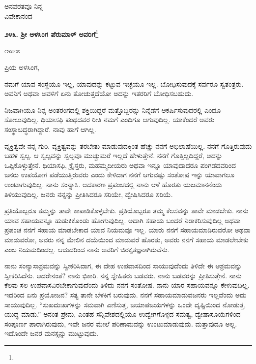 {\flushright
ಅನವರತವೂ ನಿನ್ನ\\ವಿವೇಕಾನಂದ\par}

\begin{center}
\textbf{೨೪೩. ಶ‍್ರೀ ಅಳಸಿಂಗ ಪೆರುಮಾಳ್ ಅವರಿಗೆ}\footnote{}
\end{center}

\begin{flushright}
೧೮೯೫
\end{flushright}

\noindent
ಪ್ರಿಯ ಅಳಸಿಂಗ,

ನಮಗೆ ಯಾವ ಸಂಸ್ಥೆಯೂ ಇಲ್ಲ, ಯಾವುದನ್ನು ಕಟ್ಟುವ ಇಚ್ಛೆಯೂ ಇಲ್ಲ. ಬೋಧಿಸುವುದಕ್ಕೆ ಸರ್ವರೂ ಸ್ವತಂತ್ರರು. ಅವನಿಗೆ ಅಥವಾ ಅವಳಿಗೆ ಏನು ತೋಚುತ್ತದೆಯೋ ಅದನ್ನು ಇತರರಿಗೆ ಬೋಧಿಸಬಹುದು.

ನಿಜವಾಗಿಯೂ ನಿನ್ನ ಅಂತರಂಗದಲ್ಲಿ ಶಕ್ತಿಯಿದ್ದರೆ ಮತ್ತೊಬ್ಬರನ್ನು ನಿನ್ನೆಡೆಗೆ ಆಕರ್ಷಿಸುವುದರಲ್ಲಿ ಎಂದೂ ಸೋಲುವುದಿಲ್ಲ. ಥಿಯಾಸಫಿ ಪಂಥದವರ ರೀತಿ ನಮಗೆ ಎಂದಿಗೂ ಆಗುವುದಿಲ್ಲ. ಯಾಕೆಂದರೆ ಅವರು ಸಂಸ್ಥಾಬದ್ಧರಾಗಿದ್ದಾರೆ. ನಾವು ಹಾಗೆ ಆಗಿಲ್ಲ.

ವ್ಯಕ್ತಿತ್ವವೇ ನನ್ನ ಗುರಿ. ವ್ಯಕ್ತಿತ್ವವನ್ನು ತರಬೇತು ಮಾಡುವುದಕ್ಕಿಂತ ಹೆಚ್ಚು ನನಗೆ ಅಭಿಲಾಷೆಯಿಲ್ಲ. ನನಗೆ ಗೊತ್ತಿರುವುದು ಬಹಳ ಸ್ವಲ್ಪ. ಆ ಸ್ವಲ್ಪವನ್ನು ಸ್ವಲ್ಪವೂ ಮುಚ್ಚುಮರೆ ಇಲ್ಲದೆ ಹೇಳುತ್ತೇನೆ. ನನಗೆ ಗೊತ್ತಿಲ್ಲದಿದ್ದರೆ, ಅದನ್ನು ಒಪ್ಪಿಕೊಳ್ಳುತ್ತೇನೆ. ಥಿಯಾಸಫಿ, ಕ್ರೈಸ್ತರು, ಮಹಮ್ಮದೀಯರು ಅಥವಾ ಇನ್ನೂ ಯಾವುದಾದರೂ ಪಂಗಡದವರಿಂದ ಜನರು ಉಪಯೋಗ ಪಡೆಯುತ್ತಿರುವರು ಎಂದು ಕೇಳಿದಾಗ ನನಗೆ ಆಗುವಷ್ಟು ಸಂತೋಷ ಇನ್ನು ಯಾವಾಗಲೂ ಉಂಟಾಗುವುದಿಲ್ಲ. ನಾನು ಸಂನ್ಯಾಸಿ. ಆದಕಾರಣ ಪ್ರಪಂಚದಲ್ಲಿ ನಾನು ಆಳೆ ಹೊರತು ಯಜಮಾನನೆಂದು ತಿಳಿಯುವುದಿಲ್ಲ. ಜನರು ನನ್ನನ್ನು ಪ್ರೀತಿಸಿದರೂ ಸರಿಯೇ, ದ್ವೇಷಿಸಿದರೂ ಸರಿಯೆ.

\vspace{0.2cm}

ಪ್ರತಿಯೊಬ್ಬರೂ ತಮ್ಮನ್ನು ತಾವೇ ಕಾಪಾಡಿಕೊಳ್ಳಬೇಕು. ಪ್ರತಿಯೊಬ್ಬರೂ ತಮ್ಮ ಕೆಲಸವನ್ನು ತಾವೇ ಮಾಡಬೇಕು. ನಾನು ಯಾವ ಸಹಾಯವನ್ನೂ ಹುಡುಕಿಕೊಂಡು ಹೋಗುವುದಿಲ್ಲ. ಅದಾಗಿ ಸಹಾಯ ಬಂದರೆ ನಿರಾಕರಿಸುವುದಿಲ್ಲ ಅಥವಾ ಪ್ರಪಂಚ ನನಗೆ ಸಹಾಯ ಮಾಡಬೇಕಾದ ಯಾವ ನಿಯಮವೂ ಇಲ್ಲ. ಯಾರು ನನಗೆ ಸಹಾಯಮಾಡಿರುವರೋ ಅಥವಾ ಮಾಡುವರೋ, ಅವರು ನನ್ನ ಮೇಲಿನ ದಯೆಯಿಂದ ಮಾಡುವರೆ ಹೊರತು, ಅವರು ನನಗೆ ಸಹಾಯ ಮಾಡಲೇಬೇಕು ಎಂಬ ನಿಯಮದಿಂದಲ್ಲ. ಆದುದರಿಂದ ನಾನು ಅವರಿಗೆ ಚಿರಕೃತಜ್ಞನಾಗಿರುವೆನು.

\vspace{0.2cm}

ನಾನು ಸಂನ್ಯಾಸಾಶ್ರಮವನ್ನು ಸ್ವೀಕರಿಸಿದಾಗ, ಈ ದೇಹ ಉಪವಾಸದಿಂದ ಸಾಯುವುದೆಂದು ತಿಳಿದೇ ಈ ಆಶ್ರಮವನ್ನು ಸ್ವೀಕರಿಸಿದೆನು. ಆದರೇನಂತೆ? ನಾನು ಭಿಕಾರಿ. ನನ್ನ ಸ್ನೇಹಿತರು ಬಡವರು. ನಾನು ಬಡವರನ್ನು ಪ್ರೀತಿಸುತ್ತೇನೆ. ನಾನು ಕೆಲವು ಸಲ ಉಪವಾಸವಿರಬೇಕಾಗುವುದೆಂದು ತಿಳಿದು ನನಗೆ ಸಂತೋಷ. ನಾನು ಯಾರ ಸಹಾಯವನ್ನೂ ಕೇಳುವುದಿಲ್ಲ. ಇದರಿಂದ ಏನು ಪ್ರಯೋಜನ? ಸತ್ಯ ತಾನೇ ಬೆಳಕಿಗೆ ಬರುವುದು. ನನಗೆ ಸಹಾಯಮಾಡುವಜನರು ಇಲ್ಲವೆಂದು ಅದು ಸಾಯುವುದಿಲ್ಲ. “ಸುಖದುಃಖಗಳನ್ನು ಸಮವಾಗಿ ಎಣಿಸುತ್ತ, ಜಯಾಪಜಯಗಳನ್ನು ಒಂದೇ ದೃಷ್ಟಿಯಿಂದ ನೋಡುತ್ತ, ಯುದ್ಧ ಮಾಡು.” ಅನಂತ ಪ್ರೇಮ, ಎಂತಹ ಸನ್ನಿವೇಶದಲ್ಲಿಯೂ ಉದ್ವೇಗಗೊಳ್ಳದ ಸಮತ್ವ, ದ್ವೇಷಾಸೂಯೆಗಳಿಂದ ಸಂಪೂರ್ಣ ಪಾರಾಗಿರುವುದು, ಇವೇ ಜನರ ಮೇಲೆ ಪರಿಣಾಮವನ್ನು ಉಂಟುಮಾಡುವುದು. ಮತ್ತಾವುದೂ ಅಲ್ಲ. ಇದೊಂದೇ ಜನರ ಮನಸ್ಸನ್ನು ಮುಟ್ಟುವುದು.

